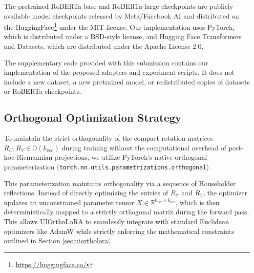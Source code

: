 The pretrained RoBERTa-base and RoBERTa-large checkpoints are publicly available
model checkpoints released by Meta/Facebook AI and distributed on the HuggingFace\footnote{\url{https://huggingface.co/}} under the MIT license. Our implementation uses PyTorch, which is
distributed under a BSD-style license, and Hugging Face Transformers and
Datasets, which are distributed under the Apache License 2.0.

The supplementary code provided with this submission contains our implementation
of the proposed adapters and experiment scripts. It does not include a new
dataset, a new pretrained model, or redistributed copies of datasets or
RoBERTa checkpoints.

\subsection{Orthogonal Optimization Strategy}
\label{app:orthogonal_optimization}

To maintain the strict orthogonality of the compact rotation matrices $R_U, R_V \in \mathbb{O}(k_{vec})$ during training without the computational overhead of post-hoc Riemannian projections, we utilize PyTorch's native orthogonal parameterization (\texttt{torch.nn.utils.parametrizations.orthogonal}). 

This parameterization maintains orthogonality via a sequence of Householder reflections. Instead of directly optimizing the entries of $R_U$ and $R_V$, the optimizer updates an unconstrained parameter tensor $X \in \mathbb{R}^{k_{vec} \times k_{vec}}$, which is then deterministically mapped to a strictly orthogonal matrix during the forward pass. This allows UIOrthoLoRA to seamlessly integrate with standard Euclidean optimizers like AdamW while strictly enforcing the mathematical constraints outlined in Section \ref{sec:uiortholora}.

